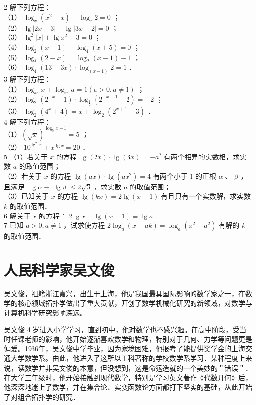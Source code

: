\documentclass[10pt]{article}
\begin{document}
2 解下列方程：\\
（1） \(\log _{x}\left(x^{2}-x\right)-\log _{x} 2=0\) ；\\
（2） \(\lg |2 x-3|-\lg |3 x-2|=0\) ；\\
（3） \(\lg ^{2}|x|+\lg x^{2}-3=0\) ；\\
（4） \(\log _{2}(x-1)-\log _{4}(x+5)=0\) ；\\
（5） \(\log _{4}(2-x)=\log _{2}(x-1)-1\) ；\\
（6） \(\log _{4}(13-3 x) \cdot \log _{(x-1)} 2=1\) ．\\
3 解下列方程：\\
（1） \(\log _{a^{2}} x+\log _{x^{2}} a=1(a>0, a \neq 1)\) ；\\
（2） \(\log _{2}\left(2^{-x}-1\right) \cdot \log _{\frac{1}{2}}\left(2^{-x+1}-2\right)=-2\) ；\\
（3） \(\log _{2}\left(4^{x}+4\right)=x+\log _{2}\left(2^{x+1}-3\right)\) ．\\
4 解下列方程：\\
（1）\((\sqrt{x})^{\log _{5} x-1}=5\) ；\\
（2） \(10^{\lg ^{2} x}+x^{\lg x}=20\) ．\\
5 （1）若关于 \(x\) 的方程 \(\lg (2 x) \cdot \lg (3 x)=-a^{2}\) 有两个相异的实数根，求实数 \(a\) 的取值范围；\\
（2）若关于 \(x\) 的方程 \(\lg (a x) \cdot \lg \left(a x^{2}\right)=4\) 有两个小于 1 的正根 \(\alpha\) 、 \(\beta\) ，且满足 \(\mid \lg \alpha-\) \(\lg \beta \mid \leqslant 2 \sqrt{3}\) ，求实数 \(a\) 的取值范围；\\
（3）已知关于 \(x\) 的方程 \(\lg (k x)=2 \lg (x+1)\) 有且只有一个实数解，求实数 \(k\) 的取值范围．\\
6 解关于 \(x\) 的方程： \(2 \lg x-\lg (x-1)=\lg a\) ．\\
7 已知 \(a>0, a \neq 1\) ，试求使方程 \(2 \log _{a}(x-a k)=\log _{a}\left(x^{2}-a^{2}\right)\) 有解的 \(k\) 的取值范围．

\section*{人民科学家吴文俊}
吴文俊，祖籍浙江嘉兴，出生于上海，他是我国最具国际影响的数学家之一，在数学的核心领域拓扑学做出了重大贡献，开创了数学机械化研究的新领域，对数学与计算机科学研究影响深远。

吴文俊 4 岁进入小学学习，直到初中，他对数学也不感兴趣。在高中阶段，受当时任课老师的影响，他开始逐渐喜欢数学和物理，特别对于几何、力学等问题更是偏爱。1936年，吴文俊中学毕业，因为家境困难，他报考了能提供奖学金的上海交通大学数学系。由此，他进入了这所以工科著称的学校数学系学习．某种程度上来说，读数学并非吴文俊的本意，但没想到，这是命运造就的一个美妙的＂错误＂．在大学三年级时，他开始接触到现代数学，特别是学习英文著作《代数几何》后，他深深地迷上了数学，并在集合论、实变函数论方面都打下坚实的基础，从此开始了对组合拓扑学的研究．
\end{document}
